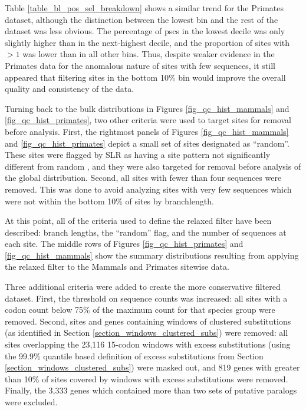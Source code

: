 Table \ref{table_bl_pos_sel_breakdown} shows a similar trend for the
Primates dataset, although the distinction between the lowest bin and
the rest of the dataset was less obvious. The percentage of \acp{psc}
in the lowest decile was only slightly higher than in the next-highest
decile, and the proportion of sites with \omgml$>1$ was lower than in
all other bins. Thus, despite weaker evidence in the Primates data for
the anomalous nature of sites with few \ngap sequences, it still
appeared that filtering sites in the bottom 10\% bin would improve the
overall quality and consistency of the data.

Turning back to the bulk distributions in Figures
\ref{fig_qc_hist_mammals} and \ref{fig_qc_hist_primates}, two other
criteria were used to target sites for removal before analysis. First,
the rightmost panels of Figures \ref{fig_qc_hist_mammals} and
\ref{fig_qc_hist_primates} depict a small set of sites designated as
``random''. These sites were flagged by SLR as having a site pattern
not significantly different from random \citep{Massingham2005}, and
they were also targeted for removal before analysis of the global
distribution. Second, all sites with fewer than four \ngap sequences
were removed. This was done to avoid analyzing sites with very few
sequences which were not within the bottom 10\% of sites by \ngap
branchlength.

At this point, all of the criteria used to define the relaxed filter
have been described: \ngap branch lengths, the ``random'' flag, and
the number of \ngap sequences at each site.
The middle rows of Figures \ref{fig_qc_hist_primates} and
\ref{fig_qc_hist_mammals} show the summary distributions resulting
from applying the relaxed filter to the Mammals and Primates sitewise
data.

Three additional criteria were added to create the more conservative
filtered dataset. First, the threshold on \ngap sequence counts was
increased: all sites with a \ngap codon count below 75\% of the
maximum \ngap count for that species group were removed. Second, sites
and genes containing windows of clustered \nsyn substitutions (as
identified in Section \ref{section_windows_clustered_subs}) were
removed: all sites overlapping the 23,116 15-codon windows with excess
\nsyn substitutions (using the 99.9\% quantile based definition of
excess substitutions from Section
\ref{section_windows_clustered_subs}) were masked out, and 819 genes
with greater than 10\% of sites covered by windows with excess \nsyn
substitutions were removed. Finally, the 3,333 genes which contained
more than two sets of putative paralogs were excluded.


